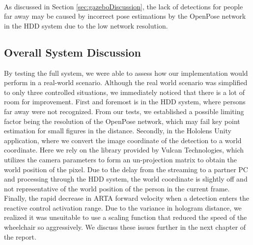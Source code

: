 \paragraph{}As discussed in Section \ref{sec:gazeboDiscussion}, the lack of detections for people far away may be caused by incorrect pose estimations by the OpenPose network in the HDD system due to the low network resolution.

\subsection{Overall System Discussion}
By testing the full system, we were able to assess how our implementation would perform in a real-world scenario. Although the real world scenario was simplified to only three controlled situations, we immediately noticed that there is a lot of room for improvement. First and foremost is in the HDD system, where persons far away were not recognized. From our tests, we established a possible limiting factor being the resolution of the OpenPose network, which may fail key point estimation for small figures in the distance. Secondly, in the Hololens Unity application, where we convert the image coordinate of the detection to a world coordinate. Here we rely on the library provided by Vulcan Technologies, which utilizes the camera parameters to form an un-projection matrix to obtain the world position of the pixel. Due to the delay from the streaming to a partner PC and processing through the HDD system, the world coordinate is slightly off and not representative of the world position of the person in the current frame. Finally, the rapid decrease in ARTA forward velocity when a detection enters the reactive control activation range. Due to the variance in hologram distance, we realized it was unsuitable to use a scaling function that reduced the speed of the wheelchair so aggressively. We discuss these issues further in the next chapter of the report.
